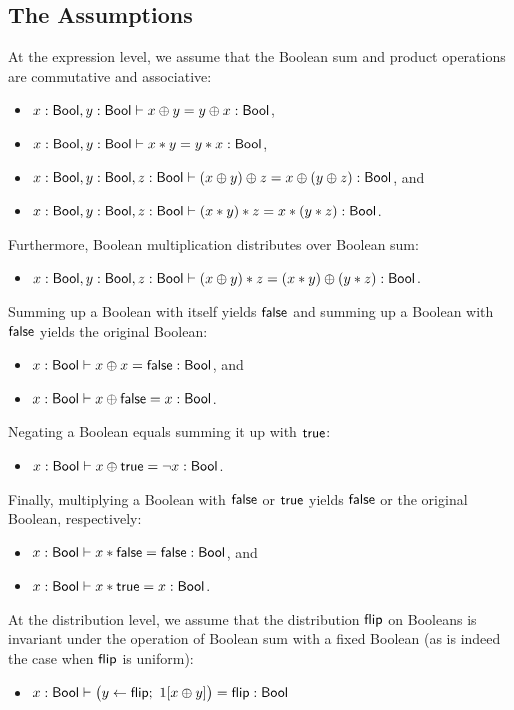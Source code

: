 \subsection{The Assumptions}
At the expression level, we assume that the Boolean sum and product operations are commutative and associative:
\begin{itemize}
\item $x : \mathsf{Bool}, y : \mathsf{Bool} \vdash x \oplus y = y \oplus x : \mathsf{Bool}$,
\item $x : \mathsf{Bool}, y : \mathsf{Bool} \vdash x * y = y * x : \mathsf{Bool}$,
\item $x : \mathsf{Bool}, y : \mathsf{Bool}, z : \mathsf{Bool} \vdash (x \oplus y) \oplus z = x \oplus (y \oplus z) : \mathsf{Bool}$, and
\item $x : \mathsf{Bool}, y : \mathsf{Bool}, z : \mathsf{Bool} \vdash (x * y) * z = x * (y * z) : \mathsf{Bool}$.
\end{itemize}
Furthermore, Boolean multiplication distributes over Boolean sum:
\begin{itemize}
\item $x : \mathsf{Bool}, y : \mathsf{Bool}, z : \mathsf{Bool} \vdash (x \oplus y) * z = (x * y) \oplus (y * z) : \mathsf{Bool}$.
\end{itemize}
Summing up a Boolean with itself yields $\mathsf{false}$ and summing up a Boolean with $\mathsf{false}$ yields the original Boolean:
\begin{itemize}
\item $x : \mathsf{Bool} \vdash x \oplus x = \mathsf{false} : \mathsf{Bool}$, and
\item $x : \mathsf{Bool} \vdash x \oplus \mathsf{false} = x : \mathsf{Bool}$.
\end{itemize}
Negating a Boolean equals summing it up with $\mathsf{true}$:
\begin{itemize}
\item $x : \mathsf{Bool} \vdash x \oplus \mathsf{true} = \neg x : \mathsf{Bool}$.
\end{itemize}
Finally, multiplying a Boolean with $\mathsf{false}$ or $\mathsf{true}$ yields $\mathsf{false}$ or the original Boolean, respectively:
\begin{itemize}
\item $x : \mathsf{Bool} \vdash x * \mathsf{false} = \mathsf{false} : \mathsf{Bool}$, and
\item $x : \mathsf{Bool} \vdash x * \mathsf{true} = x : \mathsf{Bool}$.
\end{itemize}
At the distribution level, we assume that the distribution $\mathsf{flip}$ on Booleans is invariant under the operation of Boolean sum with a fixed Boolean (as is indeed the case when $\mathsf{flip}$ is uniform):
\begin{itemize}
\item $x : \mathsf{Bool} \vdash \big(y \leftarrow \mathsf{flip}; \ 1[x \oplus y]\big) = \mathsf{flip} : \mathsf{Bool}$
\end{itemize}

